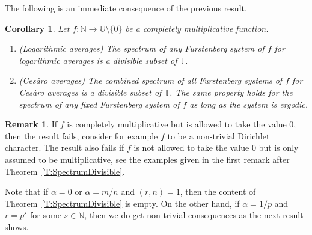 \documentclass[11pt]{amsart}
\newtheorem{corollary}[lemma]{Corollary}
\theoremstyle{definition}
\newtheorem*{remark}{Remark}
\newcommand{\N}{{\mathbb N}}
\newcommand{\T}{{\mathbb T}}
\newcommand{\U}{{\mathbb U}}
\begin{document}
The following is an immediate consequence of the previous result.
 \begin{corollary}\label{C:Divisible}
	Let   $f\colon \N\to \U\setminus \{0\}$  be  a completely multiplicative function.
	\begin{enumerate}
\item (Logarithmic averages)	The spectrum of any  Furstenberg system of $f$ for logarithmic averages  is a divisible subset of $\T$.

\smallskip

\item (Ces\`aro averages)	The combined spectrum of all Furstenberg systems of $f$ for Ces\`aro averages is a divisible subset of $\T$. The same property holds
for the spectrum of any fixed  Furstenberg system of $f$ as long as  the system is ergodic.
\end{enumerate}
\end{corollary}
\begin{remark}
If $f$ is completely multiplicative but is allowed to take the value $0$, then  the result fails, consider for example $f$ to be a non-trivial Dirichlet character. The result also fails if $f$ is not allowed to take the value $0$ but is only assumed to be multiplicative, see
the examples given in   the first remark after Theorem~\ref{T:SpectrumDivisible}.
\end{remark}
  Note that if $\alpha=0$ or $\alpha=m/n$ and $(r,n)=1$, then the content of Theorem~\ref{T:SpectrumDivisible}  is empty. On the other hand, if $\alpha=1/p$ and $r=p^s$ for some $s\in\N$,  then we do get non-trivial consequences as the next result shows.
\end{document}
